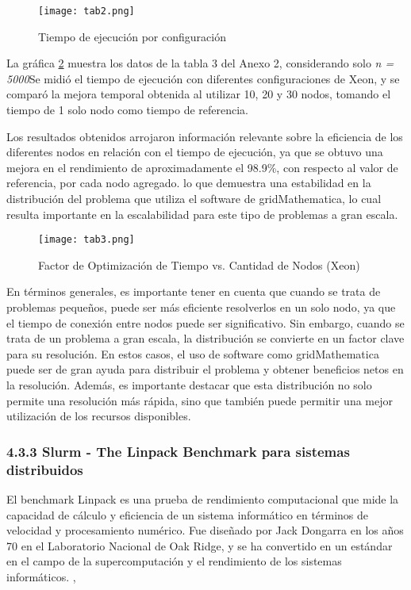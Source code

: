 \begin{spacing}{1.5}
  \begin{figure}[h]
    \centering
    \texttt{[image: tab2.png]}
    \caption{Tiempo de ejecución por configuración}
    \label{fig:etiquetab}
  \end{figure}

  La gráfica \ref{fig:etiquetac} muestra los datos de la tabla 3 del Anexo 2,
  considerando solo \textit{n = 5000}Se midió el tiempo de ejecución con
  diferentes configuraciones de Xeon, y se comparó la mejora temporal
  obtenida al utilizar 10, 20 y 30 nodos, tomando el tiempo de 1 solo nodo
  como tiempo de referencia.

  Los resultados obtenidos arrojaron información relevante sobre la
  eficiencia de los diferentes nodos en relación con el tiempo de ejecución,
  ya que se obtuvo una mejora en el rendimiento de aproximadamente el 98.9\%,
  con respecto al valor de referencia, por cada nodo agregado. lo que
  demuestra una estabilidad en la distribución del problema que utiliza el
  software de gridMathematica, lo cual resulta importante en la
  escalabilidad para este tipo de problemas a gran escala.

  \begin{figure}[h]
    \centering
    \texttt{[image: tab3.png]}
    \caption{Factor de Optimización de Tiempo vs. Cantidad de Nodos (Xeon)}
    \label{fig:etiquetac}
  \end{figure}

  En términos generales, es importante tener en cuenta que cuando se trata de problemas pequeños, puede ser más eficiente resolverlos en un solo nodo, ya que el tiempo de conexión entre nodos puede ser significativo. Sin embargo, cuando se trata de un problema a gran escala, la distribución se convierte en un factor clave para su resolución. En estos casos, el uso de software como gridMathematica puede ser de gran ayuda para distribuir el problema y obtener beneficios netos en la resolución. Además, es importante destacar que esta distribución no solo permite una resolución más rápida, sino que también puede permitir una mejor utilización de los recursos disponibles.

  \subsubsection{4.3.3 Slurm - The Linpack Benchmark para sistemas distribuidos}

  El benchmark Linpack es una prueba de rendimiento computacional que mide la capacidad de cálculo y eficiencia de un sistema informático en términos de velocidad y procesamiento numérico. Fue diseñado por Jack Dongarra en los años 70 en el Laboratorio Nacional de Oak Ridge, y se ha convertido en un estándar en el campo de la supercomputación y el rendimiento de los sistemas informáticos. \cite{linpack},  \cite{faq-linpack}


\end{spacing}
